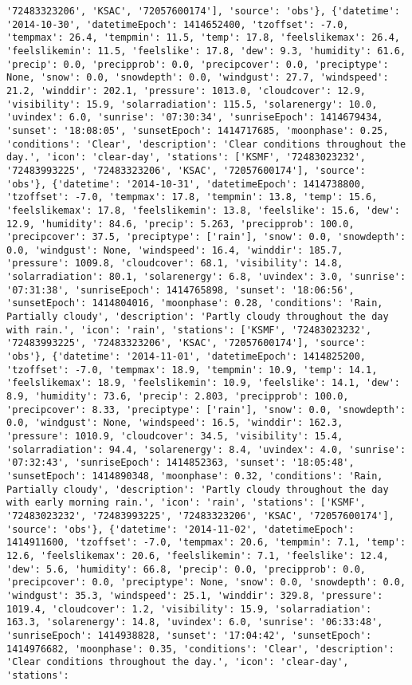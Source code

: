 \documentclass[
  letterpaper,
  DIV=11,
  numbers=noendperiod]{scrartcl}
\begin{document}
\begin{verbatim}
'72483323206', 'KSAC', '72057600174'], 'source': 'obs'}, {'datetime': '2014-10-30', 'datetimeEpoch': 1414652400, 'tzoffset': -7.0, 'tempmax': 26.4, 'tempmin': 11.5, 'temp': 17.8, 'feelslikemax': 26.4, 'feelslikemin': 11.5, 'feelslike': 17.8, 'dew': 9.3, 'humidity': 61.6, 'precip': 0.0, 'precipprob': 0.0, 'precipcover': 0.0, 'preciptype': None, 'snow': 0.0, 'snowdepth': 0.0, 'windgust': 27.7, 'windspeed': 21.2, 'winddir': 202.1, 'pressure': 1013.0, 'cloudcover': 12.9, 'visibility': 15.9, 'solarradiation': 115.5, 'solarenergy': 10.0, 'uvindex': 6.0, 'sunrise': '07:30:34', 'sunriseEpoch': 1414679434, 'sunset': '18:08:05', 'sunsetEpoch': 1414717685, 'moonphase': 0.25, 'conditions': 'Clear', 'description': 'Clear conditions throughout the day.', 'icon': 'clear-day', 'stations': ['KSMF', '72483023232', '72483993225', '72483323206', 'KSAC', '72057600174'], 'source': 'obs'}, {'datetime': '2014-10-31', 'datetimeEpoch': 1414738800, 'tzoffset': -7.0, 'tempmax': 17.8, 'tempmin': 13.8, 'temp': 15.6, 'feelslikemax': 17.8, 'feelslikemin': 13.8, 'feelslike': 15.6, 'dew': 12.9, 'humidity': 84.6, 'precip': 5.263, 'precipprob': 100.0, 'precipcover': 37.5, 'preciptype': ['rain'], 'snow': 0.0, 'snowdepth': 0.0, 'windgust': None, 'windspeed': 16.4, 'winddir': 185.7, 'pressure': 1009.8, 'cloudcover': 68.1, 'visibility': 14.8, 'solarradiation': 80.1, 'solarenergy': 6.8, 'uvindex': 3.0, 'sunrise': '07:31:38', 'sunriseEpoch': 1414765898, 'sunset': '18:06:56', 'sunsetEpoch': 1414804016, 'moonphase': 0.28, 'conditions': 'Rain, Partially cloudy', 'description': 'Partly cloudy throughout the day with rain.', 'icon': 'rain', 'stations': ['KSMF', '72483023232', '72483993225', '72483323206', 'KSAC', '72057600174'], 'source': 'obs'}, {'datetime': '2014-11-01', 'datetimeEpoch': 1414825200, 'tzoffset': -7.0, 'tempmax': 18.9, 'tempmin': 10.9, 'temp': 14.1, 'feelslikemax': 18.9, 'feelslikemin': 10.9, 'feelslike': 14.1, 'dew': 8.9, 'humidity': 73.6, 'precip': 2.803, 'precipprob': 100.0, 'precipcover': 8.33, 'preciptype': ['rain'], 'snow': 0.0, 'snowdepth': 0.0, 'windgust': None, 'windspeed': 16.5, 'winddir': 162.3, 'pressure': 1010.9, 'cloudcover': 34.5, 'visibility': 15.4, 'solarradiation': 94.4, 'solarenergy': 8.4, 'uvindex': 4.0, 'sunrise': '07:32:43', 'sunriseEpoch': 1414852363, 'sunset': '18:05:48', 'sunsetEpoch': 1414890348, 'moonphase': 0.32, 'conditions': 'Rain, Partially cloudy', 'description': 'Partly cloudy throughout the day with early morning rain.', 'icon': 'rain', 'stations': ['KSMF', '72483023232', '72483993225', '72483323206', 'KSAC', '72057600174'], 'source': 'obs'}, {'datetime': '2014-11-02', 'datetimeEpoch': 1414911600, 'tzoffset': -7.0, 'tempmax': 20.6, 'tempmin': 7.1, 'temp': 12.6, 'feelslikemax': 20.6, 'feelslikemin': 7.1, 'feelslike': 12.4, 'dew': 5.6, 'humidity': 66.8, 'precip': 0.0, 'precipprob': 0.0, 'precipcover': 0.0, 'preciptype': None, 'snow': 0.0, 'snowdepth': 0.0, 'windgust': 35.3, 'windspeed': 25.1, 'winddir': 329.8, 'pressure': 1019.4, 'cloudcover': 1.2, 'visibility': 15.9, 'solarradiation': 163.3, 'solarenergy': 14.8, 'uvindex': 6.0, 'sunrise': '06:33:48', 'sunriseEpoch': 1414938828, 'sunset': '17:04:42', 'sunsetEpoch': 1414976682, 'moonphase': 0.35, 'conditions': 'Clear', 'description': 'Clear conditions throughout the day.', 'icon': 'clear-day', 'stations': 
\end{verbatim}
\end{document}
